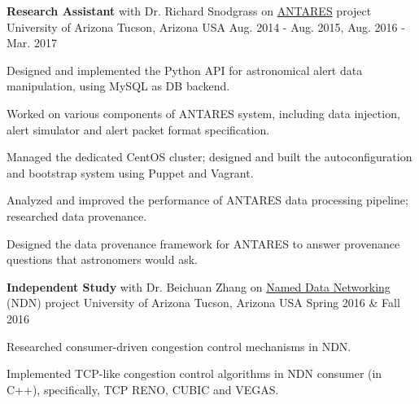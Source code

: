 

\begin{cventries}

  \cventry
    {\textbf{Research Assistant} with Dr. Richard Snodgrass on \href{https://www.noao.edu/ANTARES/}{ANTARES} project} %
    {University of Arizona} %
    {Tucson, Arizona USA} %
    {Aug. 2014 - Aug. 2015, Aug. 2016 - Mar. 2017} %
    {
      \begin{cvitems} %
      \item {Designed and implemented the Python API for astronomical
    alert data manipulation, using MySQL as DB backend.}
      \item {Worked on various components of ANTARES system,
    including data injection, alert simulator and alert packet format specification.}
        \item {Managed the dedicated CentOS cluster; designed and
    built the autoconfiguration and bootstrap 
    system using Puppet and Vagrant.}
        \item {Analyzed and improved the performance of ANTARES data
    processing pipeline; researched data provenance.}
        \item {Designed the data provenance framework for
    ANTARES to answer provenance questions that astronomers would ask.}
      \end{cvitems}
    }

  \cventry
    {\textbf{Independent Study} with Dr. Beichuan Zhang
    on \href{https://named-data.net/}{Named Data Networking} (NDN) project} %
    {University of Arizona} %
    {Tucson, Arizona USA} %
    {Spring 2016 \& Fall 2016} %
    {
      \begin{cvitems} %
        \item {Researched consumer-driven congestion control mechanisms in
    NDN.}
        \item {Implemented TCP-like congestion control algorithms in NDN
    consumer (in C++), specifically, TCP RENO, CUBIC and VEGAS.}
      \end{cvitems}
    }



\end{cventries}
